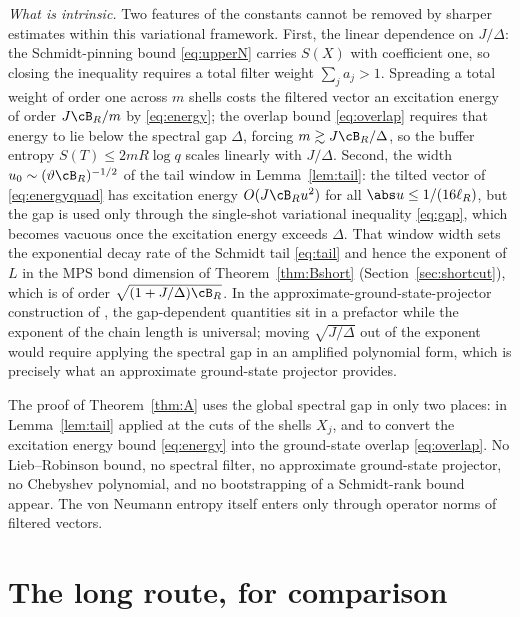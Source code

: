\begin{remark}
\emph{What is intrinsic.} Two features of the constants cannot be removed
by sharper estimates within this variational framework. First, the linear
dependence on $J/\Delta$: the Schmidt-pinning bound \eqref{eq:upperN}
carries $S(X)$ with coefficient one, so closing the inequality requires a
total filter weight $\sum_ja_j>1$. Spreading a total weight of order one
across $m$ shells costs the filtered vector an excitation energy of order
$J\cB_R/m$ by \eqref{eq:energy}; the overlap bound \eqref{eq:overlap}
requires that energy to lie below the spectral gap $\Delta$, forcing
$m\gtrsim J\cB_R/\Delta$, so the buffer entropy $S(T)\le2mR\log q$ scales
linearly with $J/\Delta$. Second, the width
$u_0\sim(\vartheta\cB_R)^{-1/2}$ of the tail window in
Lemma~\ref{lem:tail}: the tilted vector of \eqref{eq:energyquad} has
excitation energy $O(J\cB_Ru^2)$ for all $\abs u\le1/(16\ell_R)$, but the
gap is used only through the single-shot variational inequality
\eqref{eq:gap}, which becomes vacuous once the excitation energy exceeds
$\Delta$. That window width sets the exponential decay rate of the Schmidt
tail \eqref{eq:tail} and hence the exponent of $L$ in the MPS bond
dimension of Theorem~\ref{thm:Bshort} (Section~\ref{sec:shortcut}), which
is of order $\sqrt{(1+J/\Delta)\cB_R}$. In the
approximate-ground-state-projector construction of \cite{AKLV}, the
gap-dependent quantities sit in a prefactor while the exponent of the
chain length is universal; moving $\sqrt{J/\Delta}$ out of the exponent
would require applying the spectral gap in an amplified polynomial form,
which is precisely what an approximate ground-state projector provides.
\end{remark}

\begin{remark}
The proof of Theorem~\ref{thm:A} uses the global spectral gap in only two
places: in Lemma~\ref{lem:tail} applied at the cuts of the shells $X_j$,
and to convert the excitation energy bound \eqref{eq:energy} into the
ground-state overlap \eqref{eq:overlap}. No Lieb--Robinson bound, no
spectral filter, no approximate ground-state projector, no Chebyshev
polynomial, and no bootstrapping of a Schmidt-rank bound appear. The von
Neumann entropy itself enters only through operator norms of filtered
vectors.
\end{remark}

\section{The long route, for comparison}\label{sec:longroute}

